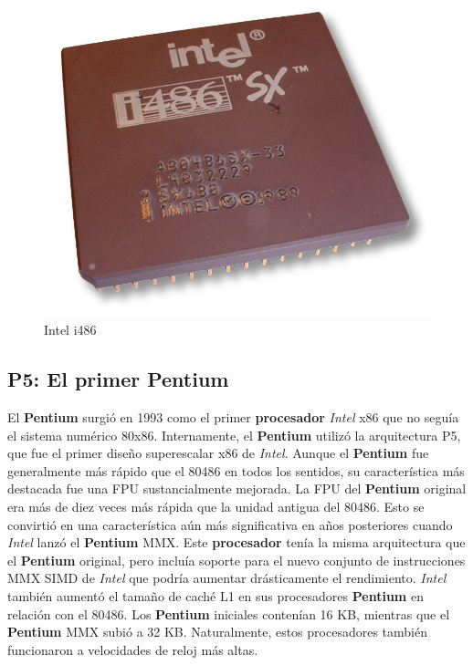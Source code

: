 \begin{figure}[htb]
	\centering
	\includegraphics[scale = 0.15]{Graphics/Intel_80486sx.jpg}
	\caption{Intel i486}
	\label{fig:21}
\end{figure}

\subsection{P5: El primer \textbf{Pentium}}
El \textbf{Pentium} surgió en 1993 como el primer \textbf{procesador} \emph{Intel} x86 que no seguía el sistema numérico 80x86. Internamente, el \textbf{Pentium} utilizó la arquitectura P5, que fue el 
primer diseño superescalar x86 de \emph{Intel}. Aunque el \textbf{Pentium} fue generalmente más rápido que el 80486 en todos los sentidos, su característica más destacada fue una FPU 
sustancialmente mejorada. La FPU del \textbf{Pentium} original era más de diez veces más rápida que la unidad antigua del 80486. Esto se convirtió en una característica aún más 
significativa en años posteriores cuando \emph{Intel} lanzó el \textbf{Pentium} MMX. Este \textbf{procesador} tenía la misma arquitectura que el \textbf{Pentium} original, pero incluía soporte para el 
nuevo conjunto de instrucciones MMX SIMD de \emph{Intel} que podría aumentar drásticamente el rendimiento. \emph{Intel} también aumentó el tamaño de caché L1 en sus procesadores \textbf{Pentium} 
en relación con el 80486. Los \textbf{Pentium} iniciales contenían 16 KB, mientras que el \textbf{Pentium} MMX subió a 32 KB. Naturalmente, estos procesadores también funcionaron a 
velocidades de reloj más altas.

